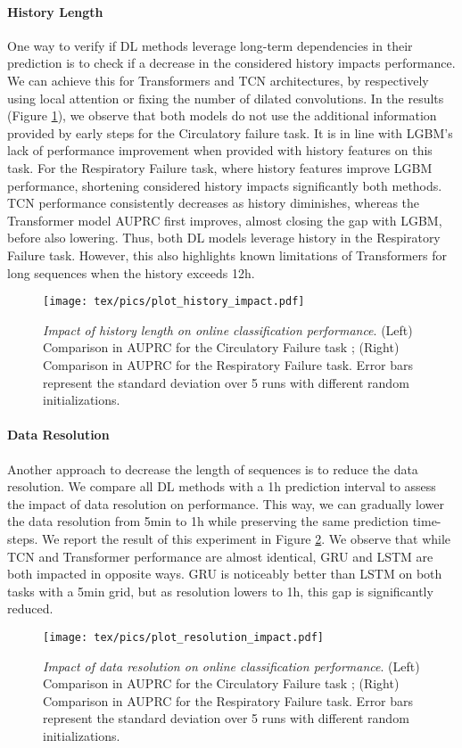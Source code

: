 \documentclass{article}
\begin{document}
\paragraph{History Length} One way to verify if DL methods leverage long-term dependencies in their prediction is to check if a decrease in the considered history impacts performance. We can achieve this for Transformers and TCN architectures, by respectively using local attention or fixing the number of dilated convolutions. In the results (Figure \ref{fig:ablation-history}), we observe that both models do not use the additional information provided by early steps for the Circulatory failure task. It is in line with LGBM's lack of performance improvement when provided with history features on this task. For the Respiratory Failure task, where history features improve LGBM performance, shortening considered history impacts significantly both methods. TCN performance consistently decreases as history diminishes, whereas the Transformer model AUPRC first improves, almost closing the gap with LGBM, before also lowering. Thus, both DL models leverage history in the Respiratory Failure task. However, this also highlights known limitations of Transformers for long sequences \cite{DBLP:journals/corr/abs-1904-10509} when the history exceeds 12h.

\begin{figure}[ht!]
    \centering
    \texttt{[image: tex/pics/plot\_history\_impact.pdf]}
    \caption{\textit{Impact of history length on online classification performance}. (Left) Comparison in AUPRC for the Circulatory Failure task ; (Right) Comparison in AUPRC for the Respiratory Failure task. Error bars represent the standard deviation over 5 runs with different random initializations.}
    \label{fig:ablation-history}
\end{figure}


\paragraph{Data Resolution} Another approach to decrease the length of sequences is to reduce the data resolution.  We compare all DL methods with a 1h prediction interval to assess the impact of data resolution on performance. This way, we can gradually lower the data resolution from 5min to 1h while preserving the same prediction time-steps. We report the result of this experiment in Figure \ref{fig:ablation-resolution}. We observe that while TCN and Transformer performance are almost identical, GRU and LSTM are both impacted in opposite ways. GRU is noticeably better than LSTM on both tasks with a 5min grid, but as resolution lowers to 1h, this gap is significantly reduced.
\begin{figure}[!ht]
    \centering
    \texttt{[image: tex/pics/plot\_resolution\_impact.pdf]}
    \caption{\textit{Impact of data resolution on online classification performance}. (Left) Comparison in AUPRC for the Circulatory Failure task ; (Right) Comparison in AUPRC for the Respiratory Failure task. Error bars represent the standard deviation over 5 runs with different random initializations.}
    \label{fig:ablation-resolution}
\end{figure}
\end{document}
